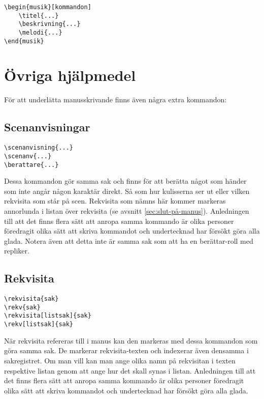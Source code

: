 \documentclass[a4paper,12pt]{article}
\begin{document}
\begin{lstlisting}
\begin{musik}[kommandon]
	\titel{...}
	\beskrivning{...}
	\melodi{...}
\end{musik}
\end{lstlisting}


\section{Övriga hjälpmedel}
För att underlätta manusskrivande finns även några extra kommandon:

\subsection{Scenanvisningar}
\begin{lstlisting}
\scenanvisning{...}
\scenanv{...}
\berattare{...}
\end{lstlisting}

Dessa kommandon gör samma sak och finns för att berätta något som händer som inte angår någon karaktär direkt. Så som hur kulisserna ser ut eller vilken rekvisita som står på scen. Rekvisita som nämns här kommer markeras annorlunda i listan över rekvisita (se avsnitt \ref{sec:slut-på-manus}). Anledningen till att det finns flera sätt att anropa samma kommando är olika personer föredragit olika sätt att skriva kommandot och undertecknad har försökt göra alla glada. Notera även att detta inte är samma sak som att ha en berättar-roll med repliker.

\subsection{Rekvisita}
\begin{lstlisting}
\rekvisita{sak}
\rekv{sak}
\rekvisita[listsak]{sak}
\rekv[listsak]{sak}
\end{lstlisting}
När rekvisita refereras till i manus kan den markeras med dessa kommandon som göra samma sak. De markerar rekvisita-texten och indexerar även densamma i sakregistret. Om man vill kan man ange olika namn på rekvisitan i texten respektive listan genom att ange hur det skall synas i listan. Anledningen till att det finns flera sätt att anropa samma kommando är olika personer föredragit olika sätt att skriva kommandot och undertecknad har försökt göra alla glada.
\end{document}

